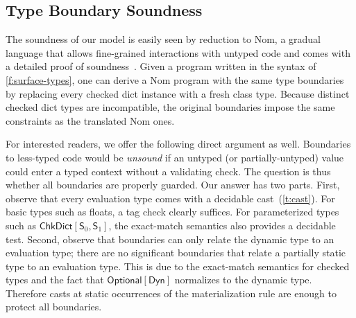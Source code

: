 \documentclass[english,cleveref,submission]{programming}
\newcommand{\code}[1]{\texttt{#1}}
\newcommand{\spapp}[2]{#1\,(#2)}
\newcommand{\spann}[2]{#1\!:\!#2}
\newcommand{\typefont}[1]{\mathsf{#1}}
\newcommand{\codefont}[1]{\emph{#1}}
\newcommand{\paramtype}[2]{#1[#2]}
\newcommand{\spteval}{\typefont{S}}
\newcommand{\sptclass}{\typefont{C}}
\newcommand{\sptdyn}{\typefont{Dyn}}
\newcommand{\sptoptional}[1]{\paramtype{\typefont{Optional}}{#1}}
\newcommand{\sptchkdict}[2]{\paramtype{\typefont{ChkDict}}{#1, #2}}
\newcommand{\sptenv}{\typefont{Env}}
\newcommand{\sptvardef}[2]{\spann{#1}{#2}}
\newcommand{\spx}{\code{x}}
\newcommand{\spf}{\code{f}}
\newcommand{\spc}{\sptclass}
\newcommand{\spexpr}{\codefont{expr}}
\newcommand{\vdashsub}[1]{\vdash_{#1}}
\newcommand{\wtprog}{\vdashsub{\mathbf{P}}}
\newcommand{\wtexpr}{\vdashsub{\mathbf{E}}}
\newcommand{\spvardef}[3]{\sptvardef{#1}{#2} = #3}
\newcommand{\spfundef}[4]{\mathrm{def}~\spapp{#1}{#2}\code{ -> }#3: #4}
\newcommand{\spclassdef}[4]{\mathrm{class}~\spapp{#1}{#2}:~#3;~#4}
\newcommand{\spself}{\code{self}}
\begin{document}
%


\subsection{Type Boundary Soundness}
\label{s:ts}

The soundness of our model is easily seen by reduction to Nom, a gradual
language that allows fine-grained interactions with untyped code and comes with
a detailed proof of soundness~\cite{mt-oopsla-2017,mt-oopsla-2021}.
Given a program written in the syntax of \cref{f:surface-types}, one can derive
a Nom program with the same type boundaries by replacing every checked
dict instance with a fresh class type.
Because distinct checked dict types are incompatible, the
original boundaries impose the same constraints as the translated Nom ones.

For interested readers, we offer the following direct argument as well.
Boundaries to less-typed code would be \emph{unsound} if an untyped
(or partially-untyped) value could enter a typed context without
a validating check.
The question is thus whether all boundaries are properly guarded.
Our answer has two parts.
First, observe that every evaluation type comes with a decidable
cast~(\cref{t:cast}).
For basic types such as floats, a tag check clearly suffices.
For parameterized types such as $\sptchkdict{\spteval_0}{\spteval_1}$,
the exact-match semantics also provides a decidable test.
Second, observe that boundaries can only relate the dynamic type to an
evaluation type; there are no significant boundaries that relate a partially
static type to an evaluation type.
This is due to the exact-match semantics for checked types and the fact that
$\sptoptional{\sptdyn}$ normalizes to the dynamic type.
Therefore casts at static occurrences of the materialization rule are
enough to protect all boundaries.
\end{document}

